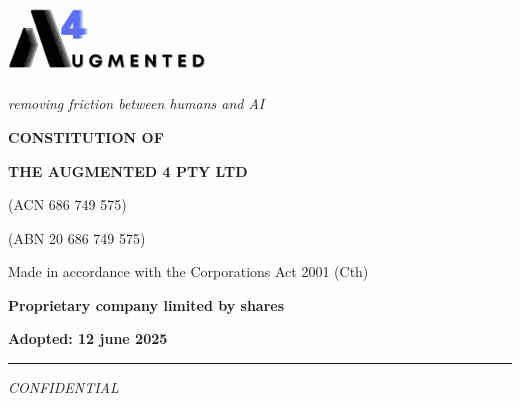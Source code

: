 \documentclass[12pt,a4paper]{article}
\begin{document}
\begin{titlepage}
    \centering
    \vspace*{1cm}
    
    \includegraphics[width=0.4\textwidth]{../images/email.jpg}
    \vspace{0.5cm}
    
    {\normalsize\itshape removing friction between humans and AI}
    \vspace{1.5cm}
    
    {\LARGE\textbf{CONSTITUTION OF}}
    \vspace{1cm}
    
    {\Large\textbf{THE AUGMENTED 4 PTY LTD}}
    \vspace{0.5cm}
    
    {\normalsize (ACN 686 749 575)}
    \vspace{0.2cm}
    
    {\normalsize (ABN 20 686 749 575)}
    \vspace{2cm}
    
    {\large Made in accordance with the Corporations Act 2001 (Cth)}
    \vspace{1cm}
    
    {\large\textbf{Proprietary company limited by shares}}
    \vspace{2cm}
    
    {\large\textbf{Adopted: 12 june 2025}}
    \vspace{1cm}
    
    \rule{0.5\textwidth}{0.5pt}
    
    \vspace{0.5cm}
    {\small\itshape CONFIDENTIAL}
\end{titlepage}

\newpage


\end{document}
